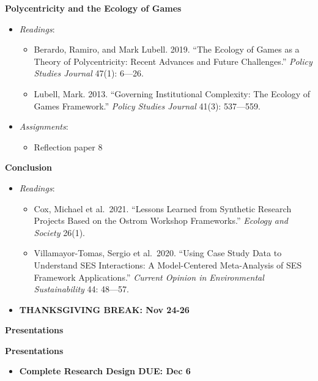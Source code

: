 \week \textbf{Polycentricity and the Ecology of Games}

\begin{itemize}

\item
  \emph{Readings}:

  \begin{itemize}
  
  \item
    Berardo, Ramiro, and Mark Lubell. 2019. ``The Ecology of Games as a
    Theory of Polycentricity: Recent Advances and Future Challenges.''
    \emph{Policy Studies Journal} 47(1): 6---26.
  \item
    Lubell, Mark. 2013. ``Governing Institutional Complexity: The
    Ecology of Games Framework.'' \emph{Policy Studies Journal} 41(3):
    537---559.
  \end{itemize}
\item
  \emph{Assignments}:

  \begin{itemize}
  
  \item
    Reflection paper 8
  \end{itemize}
\end{itemize}

\week \textbf{Conclusion}

\begin{itemize}

\item
  \emph{Readings}:

  \begin{itemize}
  
  \item
    Cox, Michael et al.~2021. ``Lessons Learned from Synthetic Research
    Projects Based on the Ostrom Workshop Frameworks.'' \emph{Ecology
    and Society} 26(1).
  \item
    Villamayor-Tomas, Sergio et al.~2020. ``Using Case Study Data to
    Understand SES Interactions: A Model-Centered Meta-Analysis of SES
    Framework Applications.'' \emph{Current Opinion in Environmental
    Sustainability} 44: 48---57.
  \end{itemize}
\item
  \textbf{THANKSGIVING BREAK: Nov 24-26}
\end{itemize}

\week \textbf{Presentations}

\week \textbf{Presentations}

\begin{itemize}

\item
  \textbf{Complete Research Design DUE: Dec 6}
\end{itemize}
